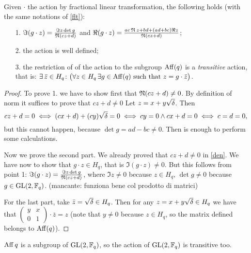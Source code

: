 \begin{prop}
Given $\cdot$ the action by fractional linear transformation, the following holds (with the same notations of \ref{flt}):
\begin{itemize}
\item[1.] $\Im (g\cdot z) = \frac{\Im z \det g}{\operatorname{\mathfrak{N}} (cz+d)}$ and
$\Re (g\cdot z) = \frac{ac\operatorname{\mathfrak{N}} z +bd+(ad+bc)\Re z}{\operatorname{\mathfrak{N}} (cz+d)}$;
\item[2.] the action is well defined;
\item[3.] the restriction of of the action to the subgroup $\operatorname{Aff} (q)$ is a {\it transitive} action, that is:
	$\exists \, \bar{z} \in H_q \colon \big( \forall z \in H_q\, \exists g \in \operatorname{Aff} (q)\,\,\text{such that}\,\, z=g \cdot \bar{z} \big) $. 
\end{itemize}
\begin{proof}
To prove 1. we have to show first that $\operatorname{\mathfrak{N}} (cz+d)\neq 0$. 
By definition of norm it suffices to prove that $cz+d\neq 0$  Let $z=x+y\sqrt{\delta}$. Then
\begin{equation}\label{den}
	cz+d=0 \iff (cx+d)+(cy)\sqrt{\delta}=0 \iff cy=0 \land cx+d=0 \iff c=d=0,
\end{equation}
but this cannot happen, because $\det g = ad-bc \neq 0$. Then is enough to perform some calculations.

Now we prove the second part. We already proved that $cz+d\neq 0$ in \ref{den}.
We have now to show that $g\cdot z \in H_q$, that is $\Im (g\cdot z)\neq 0$. But this follows from point 1:
$\Im (g\cdot z) = \frac{\Im z \det g}{\operatorname{\mathfrak{N}} (cz+d)}$, where $\Im z \neq 0$ because $z \in H_q$,
$\det g \neq 0$ because $g \in \operatorname{GL}(2,{\mathbb F}_q)$. (mancante: funziona bene col prodotto di matrici)

For the last part, take $\bar{z} = \sqrt{\delta} \in H_q$. Then for any $z=x+y\sqrt{\delta} \in H_q$ we have that $\begin{pmatrix} y & x \\ 0 & 1 \end{pmatrix} \cdot \bar{z} = z$ (note that $y\neq 0$ because $z \in H_q$, so the matrix defined belongs to $\operatorname{Aff} (q)$).
\end{proof}
\end{prop}
\begin{rem}
$\operatorname{Aff} q$ is a subgroup of $\operatorname{GL}(2,{\mathbb F}_q)$, so the action of $\operatorname{GL}(2,{\mathbb F}_q)$ is transitive too.
\end{rem}

